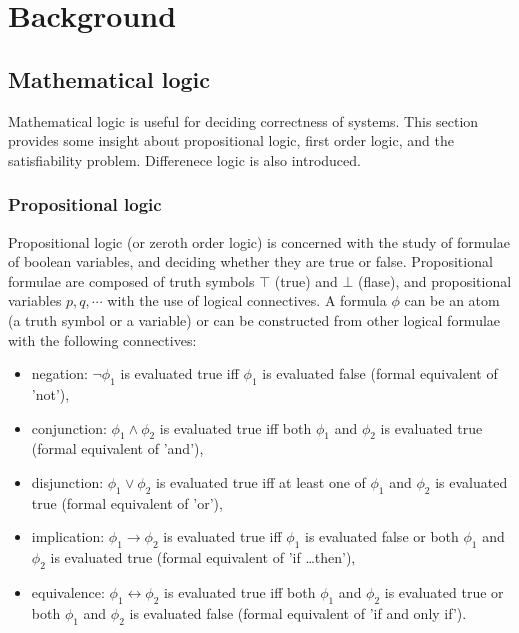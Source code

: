 \chapter{Background}
\label{chap:background}


\section{Mathematical logic}

Mathematical logic is useful for deciding correctness of systems. This section provides some insight about propositional logic, first order logic, and the satisfiability problem. Differenece logic is also introduced.

\subsection{Propositional logic}

Propositional logic (or zeroth order logic) is concerned with the study of formulae of boolean variables, and deciding whether they are true or false. Propositional formulae are composed of truth symbols $\top$ (true) and $\bot$ (flase),  and propositional variables $p,q, \cdots$ with the use of logical connectives. A formula $\phi$ can be an atom (a truth symbol or a variable) or can be constructed from other logical formulae with the following connectives:

\begin{itemize}
	\item negation: $\neg\phi_1$ is evaluated true iff $\phi_1$ is evaluated false (formal equivalent of 'not'),
	\item conjunction: $\phi_1 \wedge \phi_2$ is evaluated true iff  both $\phi_1$ and $\phi_2$ is evaluated true (formal equivalent of 'and'),
	\item disjunction: $\phi_1 \vee \phi_2$ is evaluated true iff  at least one of $\phi_1$ and $\phi_2$ is evaluated true (formal equivalent of 'or'),
	\item implication: $\phi_1 \to \phi_2$ is evaluated true iff  $\phi_1$ is evaluated false or both $\phi_1$ and $\phi_2$ is evaluated true (formal equivalent of 'if \ldots then'),
	\item equivalence: $\phi_1 \leftrightarrow \phi_2$ is evaluated true iff   both $\phi_1$ and $\phi_2$ is evaluated true or  both $\phi_1$ and $\phi_2$ is evaluated false (formal equivalent of 'if and only if').
\end{itemize}

